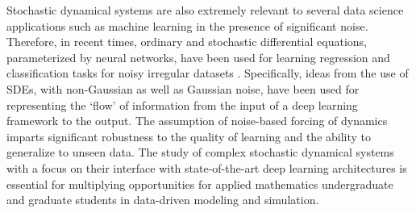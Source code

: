 \documentclass[11pt]{NSFamsart}
\begin{document}
 
Stochastic dynamical systems are also extremely relevant to several data science applications such as machine learning in the presence of significant noise. Therefore, in recent times, ordinary and stochastic differential equations, parameterized by neural networks, have been used for learning regression and classification tasks for noisy irregular datasets \cite{chen2018neural,rubanova2019latent,jia2019neural,tzen2019neural,look2020deterministic,liu2019neural}. Specifically, ideas from the use of  SDEs, with non-Gaussian as well as Gaussian noise, have been used for representing the `flow' of information from the input of a deep learning framework to the output. The assumption of noise-based forcing of dynamics imparts significant robustness to the quality of learning and the ability to generalize to unseen data. The study of complex stochastic dynamical systems with a focus on their interface with state-of-the-art deep learning architectures is essential for multiplying opportunities for applied mathematics undergraduate and graduate students in data-driven modeling and simulation. 



 
\end{document}
